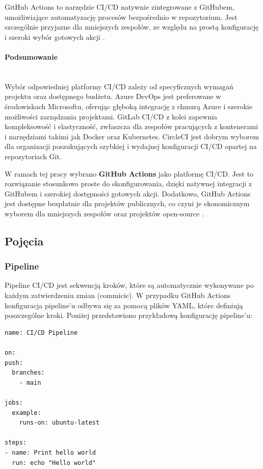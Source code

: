 \documentclass{article}
\begin{document}
GitHub Actions to narzędzie CI/CD natywnie zintegrowane z GitHubem, umożliwiające automatyzację procesów bezpośrednio w repozytorium. Jest szczególnie przyjazne dla mniejszych zespołów, ze względu na prostą konfigurację i szeroki wybór gotowych akcji \cite{GitHubActionsImporter}.

\paragraph{Podsumowanie}\mbox{} \\

Wybór odpowiedniej platformy CI/CD zależy od specyficznych wymagań projektu oraz dostępnego budżetu. Azure DevOps jest preferowane w środowiskach Microsoftu, oferując głęboką integrację z chmurą Azure i szerokie możliwości zarządzania projektami. GitLab CI/CD z kolei zapewnia kompleksowość i elastyczność, zwłaszcza dla zespołów pracujących z kontenerami i narzędziami takimi jak Docker oraz Kubernetes. CircleCI jest dobrym wyborem dla organizacji poszukujących szybkiej i wydajnej konfiguracji CI/CD opartej na repozytoriach Git. 

W ramach tej pracy wybrano \textbf{GitHub Actions} jako platformę CI/CD. Jest to rozwiązanie stosunkowo proste do skonfigurowania, dzięki natywnej integracji z GitHubem i szerokiej dostępności gotowych akcji. Dodatkowo, GitHub Actions jest dostępne bezpłatnie dla projektów publicznych, co czyni je ekonomicznym wyborem dla mniejszych zespołów oraz projektów open-source \cite{GitHubActionsImporter}.

\subsection{Pojęcia}

\subsubsection{Pipeline}

Pipeline CI/CD jest sekwencją kroków, które są automatycznie wykonywane po każdym zatwierdzeniu zmian (commicie). W przypadku GitHub Actions konfiguracja pipeline’u odbywa się za pomocą plików YAML, które definiują poszczególne kroki. Poniżej przedstawiono przykładową konfigurację pipeline'u:

\begin{lstlisting}[caption=Przykładowa konfiguracja pipeline'u w Github Actions]
name: CI/CD Pipeline

on:
push:
  branches:
    - main

jobs:
  example:
    runs-on: ubuntu-latest

steps:
- name: Print hello world
  run: echo "Hello world"

\end{lstlisting}
\end{document}
